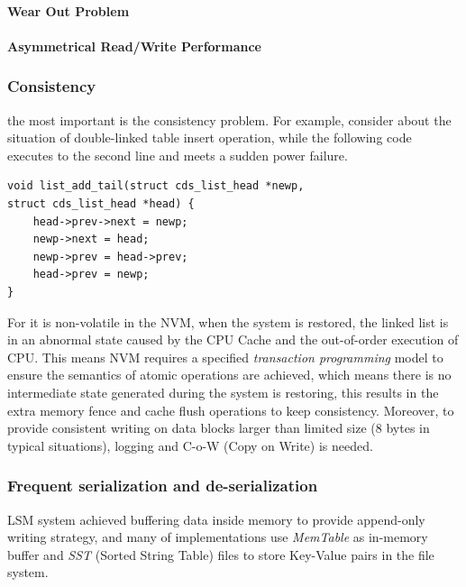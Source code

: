 \paragraph{Wear Out Problem}

\paragraph{Asymmetrical Read/Write Performance}

\subsubsection{Consistency}

the most important is the consistency problem. For example, consider about the situation of double-linked table insert operation, while the following code executes to the second line and meets a sudden power failure.
\begin{verbatim}
void list_add_tail(struct cds_list_head *newp,
struct cds_list_head *head) {
	head->prev->next = newp;
	newp->next = head;
	newp->prev = head->prev;
	head->prev = newp;
}
\end{verbatim}
For it is non-volatile in the NVM, when the system is restored, the linked list is in an abnormal state caused by the CPU Cache and the out-of-order execution of CPU. This means NVM requires a specified \textit{transaction programming} model\cite{dulloor2014system,ren2015thynvm} to ensure the semantics of atomic operations are achieved, which means there is no intermediate state generated during the system is restoring, this results in the extra memory fence and cache flush operations to keep consistency. Moreover, to provide consistent writing on data blocks larger than limited size (8 bytes in typical situations), logging and C-o-W (Copy on Write) is needed.

\subsubsection{Frequent serialization and de-serialization}

LSM system achieved buffering data inside memory to provide append-only writing strategy, and many of implementations use \textit{MemTable} as in-memory buffer and \textit{SST} (Sorted String Table) files to store Key-Value pairs in the file system. 

